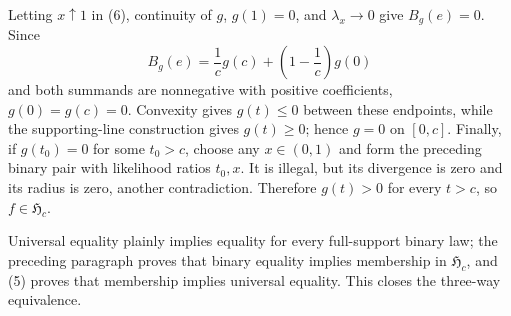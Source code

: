 Letting \(x\uparrow1\) in (6), continuity of \(g\), \(g(1)=0\), and \(\lambda_x\to0\) give \(B_g(e)=0\).  Since
\[
 B_g(e)=\frac1c g(c)+\left(1-\frac1c\right)g(0)
\]
and both summands are nonnegative with positive coefficients, \(g(0)=g(c)=0\).  Convexity gives \(g(t)\le0\) between these endpoints, while the supporting-line construction gives \(g(t)\ge0\); hence \(g=0\) on \([0,c]\).  Finally, if \(g(t_0)=0\) for some \(t_0>c\), choose any \(x\in(0,1)\) and form the preceding binary pair with likelihood ratios \(t_0,x\).  It is illegal, but its divergence is zero and its radius is zero, another contradiction.  Therefore \(g(t)>0\) for every \(t>c\), so \(f\in\mathfrak H_c\).

Universal equality plainly implies equality for every full-support binary law; the preceding paragraph proves that binary equality implies membership in \(\mathfrak H_c\), and (5) proves that membership implies universal equality.  This closes the three-way equivalence.